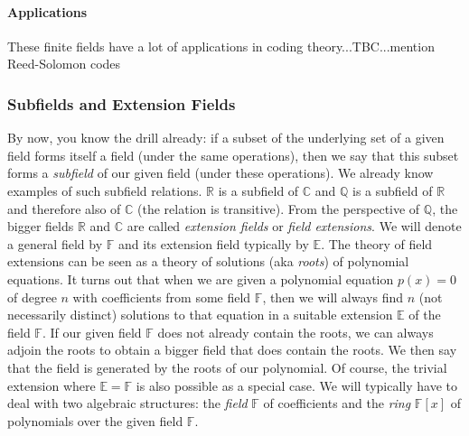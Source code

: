 


\paragraph{Applications}
These finite fields have a lot of applications in coding theory...TBC...mention Reed-Solomon codes



\subsubsection{Subfields and Extension Fields}
By now, you know the drill already: if a subset of the underlying set of a given field forms itself a field (under the same operations), then we say that this subset forms a \emph{subfield} of our given field (under these operations). We already know examples of such subfield relations. $\mathbb{R}$ is a subfield of $\mathbb{C}$ and $\mathbb{Q}$ is a subfield of $\mathbb{R}$ and therefore also of $\mathbb{C}$ (the relation is transitive). From the perspective of $\mathbb{Q}$, the bigger fields $\mathbb{R}$ and $\mathbb{C}$ are called \emph{extension fields} or \emph{field extensions}. We will denote a general field by $\mathbb{F}$ and its extension field typically by $\mathbb{E}$. The theory of field extensions can be seen as a theory of solutions (aka \emph{roots}) of polynomial equations. It turns out that when we are given a polynomial equation $p(x) = 0$ of degree $n$ with coefficients from some field $\mathbb{F}$, then we will always find $n$ (not necessarily distinct) solutions to that equation in a suitable extension $\mathbb{E}$ of the field $\mathbb{F}$. If our given field $\mathbb{F}$ does not already contain the roots, we can always adjoin the roots to obtain a bigger field that does contain the roots. We then say that the field is generated by the roots of our polynomial. Of course, the trivial extension where $\mathbb{E} = \mathbb{F}$ is also possible as a special case. We will typically have to deal with two algebraic structures: the \emph{field} $\mathbb{F}$ of coefficients and the \emph{ring} $\mathbb{F}[x]$ of polynomials over the given field $\mathbb{F}$.

